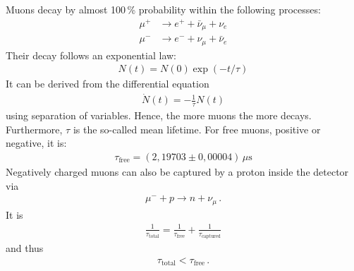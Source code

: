 Muons decay by almost 100\,\% probability within the following processes:
\begin{align}
	\mu^+&\longrightarrow e^++\bar{\nu}_\mu+\nu_e\\
	\mu^-&\longrightarrow e^-+\nu_\mu+\bar{\nu}_e
\end{align}
Their decay follows an exponential law:
\begin{align}
	N(t)=N(0)\exp(-t/\tau)
\end{align}
It can be derived from the differential equation
\begin{align}
	\dot{N}(t)=-\frac{1}{\tau}N(t)
\end{align}
using separation of variables. Hence, the more muons the more decays. Furthermore, $\tau$ is the so-called mean lifetime. For free muons, positive or negative, it is:
\begin{align}
	\tau_\text{free}=(2,19703\pm 0,00004)\,\mu\text{s}
\end{align}
Negatively charged muons can also be captured by a proton inside the detector via
\begin{align}
	\mu^-+p \longrightarrow n+\nu_\mu\,.
\end{align}
It is 
\begin{align}
	\frac{1}{\tau_\text{total}}=\frac{1}{\tau_\text{free}}+\frac{1}{\tau_\text{captured}}
\end{align}
and thus
\begin{align}
	\tau_\text{total}<\tau_\text{free}\,.
\end{align}

